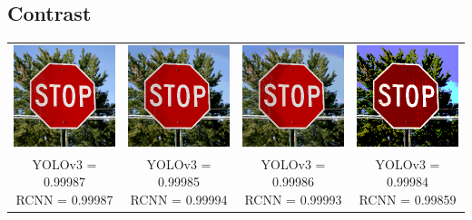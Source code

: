 \documentclass{article}
\begin{document}
\subsection{Contrast}
\begin{center}
\begin{tabular}{ c c c c }
    \includegraphics[width=0.2\linewidth]{../test_images/stop.png} & \includegraphics[width=0.2\linewidth]{../test_images/perturbed/stop_contrast_0_050.png} & \includegraphics[width=0.2\linewidth]{../test_images/perturbed/stop_contrast_0_025.png} & \includegraphics[width=0.2\linewidth]{../test_images/perturbed/stop_contrast_0_010.png} \\
    \makecell{YOLOv3 = 0.99987 \\ RCNN = 0.99987} & \makecell{YOLOv3 = 0.99985 \\ RCNN = 0.99994} & \makecell{YOLOv3 = 0.99986 \\ RCNN = 0.99993} & \makecell{YOLOv3 = 0.99984 \\ RCNN = 0.99859} \\  
\end{tabular}
\end{center}
\end{document}
